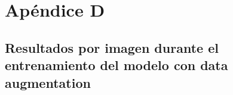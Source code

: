 
\chapter{Apéndice D}\label{ap:apendiceD}

\section{Resultados por imagen durante el entrenamiento del modelo con data augmentation}


\endinput
